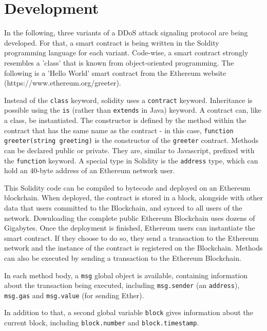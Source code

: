 \chapter{Development}

In the following, three variants of a DDoS attack signaling protocol are being developed. For that, a smart contract is being written in the Soldity programming language \cite{Solc} for each variant. Code-wise, a smart contract strongly resembles a 'class' that is known from object-oriented programming. The following is a 'Hello World' smart contract from the Ethereum website (https://www.ethereum.org/greeter).



Instead of the \texttt{class} keyword, solidity uses a \texttt{contract} keyword. Inheritance is possible using the \texttt{is} (rather than \texttt{extends} in Java) keyword. A contract can, like a class, be instantiated. The constructor is defined by the method within the contract that has the same name as the contract - in this case, \texttt{function greeter(string greeting)} is the constructor of the \texttt{greeter} contract. Methods can be declared public or private. They are, similar to Javascript, prefixed with the \texttt{function} keyword. A special type in Solidity is the \texttt{address} type, which can hold an 40-byte address of an Ethereum network user.

This Solidity code can be compiled to bytecode and deployed on an Ethereum blockchain. When deployed, the contract is stored in a block, alongside with other data that users committed to the Blockchain, and synced to all users of the network. Downloading the complete public Ethereum Blockchain uses dozens of Gigabytes. Once the deployment is finished, Ethereum users can instantiate the smart contract. If they choose to do so, they  send a transaction to the Ethereum network and the instance of the contract is registered on the Blockchain. Methods can also be executed by sending a transaction to the Ethereum Blockchain.

In each method body, a \texttt{msg} global object is available, containing information about the transaction being executed, including \texttt{msg.sender} (an \texttt{address}), \texttt{msg.gas} and \texttt{msg.value} (for sending Ether).

In addition to that, a second global variable \texttt{block} gives information about the current block, including \texttt{block.number} and \texttt{block.timestamp}.

